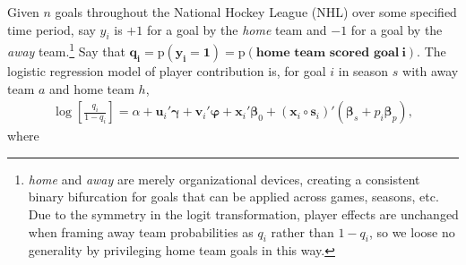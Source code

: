 Given $n$ goals throughout the National Hockey League (NHL) over some
specified time period,  say $y_i$ is $+1$ for a goal by the \textit{home} team
and $-1$ for a goal by the \textit{away} team.\footnote{{\em home} and {\em
away} are merely organizational devices, creating a consistent binary
bifurcation for goals that can be applied across games, seasons, etc. Due to
the symmetry in the logit transformation, player effects are unchanged when
framing away team probabilities as $q_i$ rather than $1-q_i$, so we loose no
generality by privileging home team goals in this way.}  Say that $\boldsymbol{q_i =
\mathrm{p}(y_i = 1) =  \mathrm{p}(\textbf{home~team~scored~goal}~i)}$.  The
logistic regression model of player contribution is, for goal $i$ in season
$s$ with away team $a$ and home team $h$,  
\begin{align}\label{hockeymod}
\log\left[\frac{q_{i}}{1-q_{i}}\right] = \alpha + \mathbf{u}_i'\boldsymbol{\gamma} +
\mathbf{v}_i'\boldsymbol{\varphi} + \mathbf{x}_i'\boldsymbol{\beta}_0 +
(\mathbf{x}_i\circ\mathbf{s}_i)'(\boldsymbol{\beta}_s + p_i \boldsymbol{\beta}_{p}), 
\end{align}  
where
